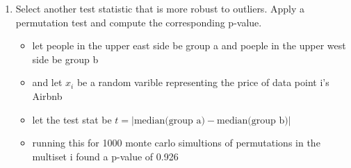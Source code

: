 \documentclass[12pt,twoside]{article}
\begin{document}
\begin{enumerate}
\begin{enumerate}
\item Select another test statistic that is more robust to outliers. Apply a permutation test and compute the corresponding p-value.
\begin{itemize}
  \color{blue}
  \item let people in the upper east side be group a and poeple in the upper west side be group b 
  \item and let $x_i$ be a random varible representing the price of data point i's Airbnb
  \item let the test stat be $t=|\text{median(group a)}-\text{median(group b)}|$
  \item running this for 1000 monte carlo simultions of permutations in the multiset i found a p-value of 0.926
 
\end{itemize}

\end{enumerate}
\end{enumerate}
\end{document}
